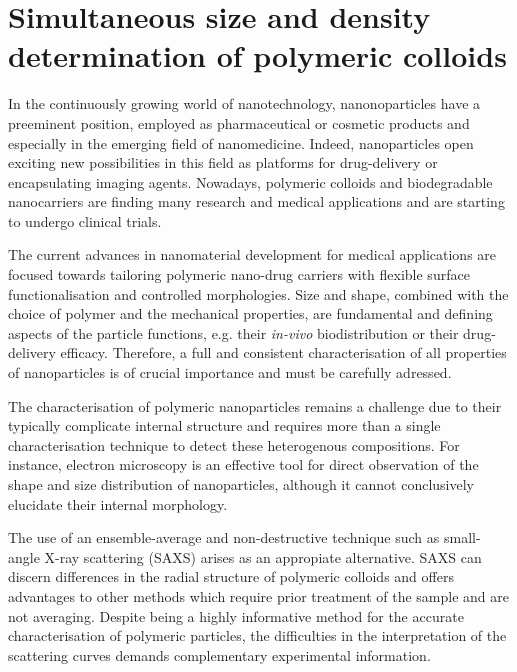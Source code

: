 \chapter{Simultaneous size and density determination of polymeric colloids}
\label{chap:simultaneous_size_density}
In the continuously growing world of nanotechnology, nanonoparticles have a preeminent position, employed as pharmaceutical or cosmetic products\citep{guterres_polymeric_2007} and especially in the emerging field of nanomedicine. Indeed, nanoparticles open exciting new possibilities in this field as platforms for drug-delivery\citep{wang_nanoparticle_2012} or encapsulating imaging agents\citep{tao_shape-specific_2011}. Nowadays, polymeric colloids and biodegradable nanocarriers are finding many research and medical applications\citep{vicent_polymer_2006} and are starting to undergo clinical trials\citep{patel_polymeric_2012,beija_colloidal_2012,cabral_progress_2014}.

The current advances in nanomaterial development for medical applications are focused towards tailoring polymeric nano-drug carriers with flexible surface functionalisation and controlled morphologies\citep{euliss_imparting_2006,yang_shape-memory_2005}. Size and shape, combined with the choice of polymer and the mechanical properties, are fundamental and defining aspects of the particle functions, e.g. their \emph{in-vivo} biodistribution\citep{vittaz_effect_1996,mitragotri_physical_2009,doshi_designer_2009} or their drug-delivery efficacy\citep{powers_research_2006}. Therefore, a full and consistent characterisation of all properties of nanoparticles is of crucial importance and must be carefully adressed.

The characterisation of polymeric nanoparticles remains a challenge due to their typically complicate internal structure\citep{beyer_saxs_1990} and requires more than a single characterisation technique to detect these heterogenous compositions. For instance, electron microscopy is an effective tool for direct observation of the shape and size distribution of nanoparticles, although it cannot conclusively elucidate their internal morphology.

The use of an ensemble-average and non-destructive technique such as small-angle X-ray scattering (SAXS) arises as an appropiate alternative\citep{leonard_jr_size_1952,motzkus_untersuchung_1959}. SAXS can discern differences in the radial structure of polymeric colloids and offers advantages to other methods which require prior treatment of the sample and are not averaging\citep{silverstein_microstructure_1989,joensson_morphology_1991}. Despite being a highly informative method for the accurate characterisation of polymeric particles, the difficulties in the interpretation of the scattering curves demands complementary experimental information\citep{mykhaylyk_structural_2012}.

